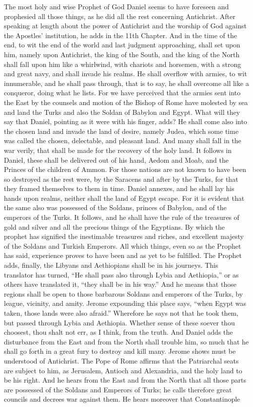 The most holy and wise Prophet of God Daniel seems to have foreseen and prophesied all those things, as he did all the rest concerning Antichrist. After speaking at length about the power of Antichrist and the worship of God against the Apostles' institution, he adds in the 11th Chapter. And in the time of the end, to wit the end of the world and last judgment approaching, shall set upon him, namely upon Antichrist, the king of the South, and the king of the North shall fall upon him like a whirlwind, with chariots and horsemen, with a strong and great navy, and shall invade his realms. He shall overflow with armies, to wit innumerable, and he shall pass through, that is to say, he shall overcome all like a conqueror, doing what he lists. For we have perceived that the armies sent into the East by the counsels and motion of the Bishop of Rome have molested by sea and land the Turks and also the Soldan of Babylon and Egypt. What will they say that Daniel, pointing as it were with his finger, adds? He shall come also into the chosen land and invade the land of desire, namely Judea, which some time was called the chosen, delectable, and pleasant land. And many shall fall in the war verily, that shall be made for the recovery of the holy land. It follows in Daniel, these shall be delivered out of his hand, Aedom and Moab, and the Princes of the children of Ammon. For those nations are not known to have been so destroyed as the rest were, by the Saracens and after by the Turks, for that they framed themselves to them in time. Daniel annexes, and he shall lay his hands upon realms, neither shall the land of Egypt escape. For it is evident that the same also was possessed of the Soldans, princes of Babylon, and of the emperors of the Turks. It follows, and he shall have the rule of the treasures of gold and silver and all the precious things of the Egyptians. By which the prophet has signified the inestimable treasures and riches, and excellent majesty of the Soldans and Turkish Emperors. All which things, even so as the Prophet has said, experience proves to have been and as yet to be fulfilled. The Prophet adds, finally, the Libyans and Aethiopians shall be in his journeys. This translator has turned, “He shall pass also through Lybia and Aethiopia,” or as others have translated it, “they shall be in his way.” And he means that those regions shall be open to those barbarous Soldans and emperors of the Turks, by league, vicinity, and amity. Jerome expounding this place says, “when Egypt was taken, those lands were also afraid.” Wherefore he says not that he took them, but passed through Lybia and Aethiopia. Whether sense of these soever thou choosest, thou shalt not err, as I think, from the truth. And Daniel adds the disturbance from the East and from the North shall trouble him, so much that he shall go forth in a great fury to destroy and kill many. Jerome shows must be understood of Antichrist. The Pope of Rome affirms that the Patriarchal seats are subject to him, as Jerusalem, Antioch and Alexandria, and the holy land to be his right. And he hears from the East and from the North that all those parts are possessed of the Soldans and Emperors of Turks; he calls therefore great councils and decrees war against them. He hears moreover that Constantinople 